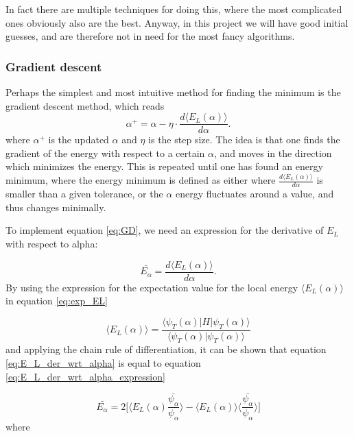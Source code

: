 \documentclass[norsk,a4paper,12pt]{article}
\begin{document}
In fact there are multiple techniques for doing this, where the most complicated ones obviously also are the best. Anyway, in this project we will have good initial guesses, and are therefore not in need for the most fancy algorithms. 

\subsubsection{Gradient descent}
Perhaps the simplest and most intuitive method for finding the minimum is the gradient descent method, which reads
\begin{equation}
\label{eq:GD}
\alpha^+=\alpha - \eta\cdot\frac{d\langle E_L(\alpha)\rangle}{d\alpha}.
\end{equation}
where $\alpha^+$ is the updated $\alpha$ and $\eta$ is the step size. The idea is that one finds the gradient of the energy with respect to a certain $\alpha$, and moves in the direction which minimizes the energy. This is repeated until one has found an energy minimum, where the energy minimum is defined as either where $\frac{d\langle E_L(\alpha)\rangle}{d\alpha}$ is smaller than a given tolerance, or the $\alpha$ energy fluctuates around a value, and thus changes minimally.
\par 
\vspace{3mm}

To implement equation \ref{eq:GD}, we need an expression for the derivative of $E_L$ with respect to alpha:

\begin{equation}
	\label{eq:E_L_der_wrt_alpha}
	\bar{E_{\alpha}} = \frac{d \langle E_L (\alpha) \rangle}{d \alpha}.
\end{equation}
By using the expression for the expectation value for the local energy $ \langle E_L (\alpha) \rangle$ in equation \ref{eq:exp_EL} 

\begin{equation}
	\label{eq:exp_EL}
	\langle E_L (\alpha) \rangle = \frac{ \langle \psi_T(\alpha) | H | \psi_T(\alpha)  \rangle}{ \langle \psi_T(\alpha)  |  \psi_T(\alpha)  \rangle }
\end{equation}
and applying the chain rule of differentiation, it can be shown that equation \ref{eq:E_L_der_wrt_alpha} is equal to equation \ref{eq:E_L_der_wrt_alpha_expression}

\begin{equation}
	\label{eq:E_L_der_wrt_alpha_expression}
	\bar{E_{\alpha}} = 2 \bigg[\langle E_L (\alpha)  \frac{ \bar{\psi_{\alpha}}}{\psi_{\alpha}}\rangle - \langle E_L (\alpha) \rangle \langle \frac{\bar{\psi_{\alpha}}}{\psi_{\alpha}} \rangle\bigg]
\end{equation}
where
\end{document}
